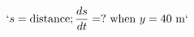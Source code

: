 \documentclass[preview]{standalone}
\begin{document}
\begin{align*}
`s = \text{distance}; \frac{ds}{dt} = ? \text{ when } y = 40 \text{ m}`
\end{align*}
\end{document}
